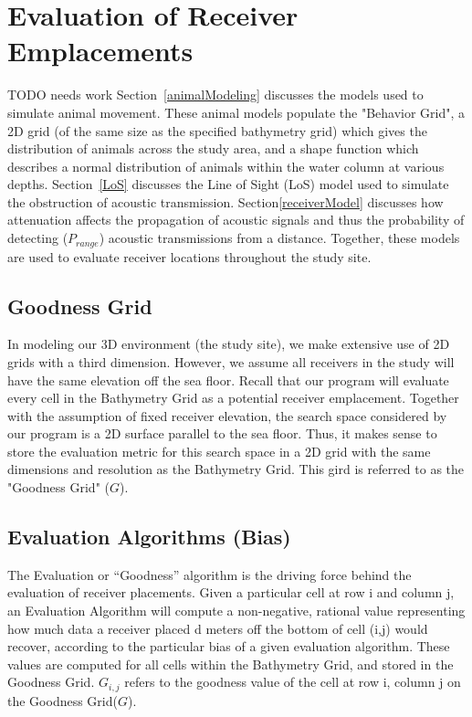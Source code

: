 \section{Evaluation of Receiver Emplacements} TODO needs work
\label{evaluationOfReceiver}
Section~\ref{animalModeling} discusses the models used to simulate animal movement.  These animal models populate the "Behavior Grid", a 2D grid (of the same size as the specified bathymetry grid) which gives the distribution of animals across the study area, and a shape function which describes a normal distribution of animals within the water column at various depths.  Section~\ref{LoS} discusses the Line of Sight (LoS) model used to simulate the obstruction of acoustic transmission.  Section\ref{receiverModel} discusses how attenuation affects the propagation of acoustic signals and thus the probability of detecting ($P_{range}$) acoustic transmissions from a distance.  Together, these models are used to evaluate receiver locations throughout the study site.  



\subsection{Goodness Grid}
\label{goodnessGrid}
In modeling our 3D environment (the study site), we make extensive use of 2D grids with a third dimension.  However, we assume all receivers in the study will have the same elevation off the sea floor.  Recall that our program will evaluate every cell in the Bathymetry Grid as a potential receiver emplacement.  Together with the assumption of fixed receiver elevation, the search space considered by our program is a 2D surface parallel to the sea floor.  Thus, it makes sense to store the evaluation metric for this search space in a 2D grid with the same dimensions and resolution as the Bathymetry Grid.  This gird is referred to as the "Goodness Grid" ($G$).  

\subsection{Evaluation Algorithms (Bias)}
The Evaluation or “Goodness” algorithm is the driving force behind the evaluation of receiver placements.  Given a particular cell at row i and column j, an Evaluation Algorithm will compute a non-negative, rational value representing how much data a receiver placed d meters off the bottom of cell (i,j) would recover, according to the particular bias of a given evaluation algorithm.  These values are computed for all cells within the Bathymetry Grid, and stored in the Goodness Grid.  $G_{i,j}$ refers to the goodness value of the cell at row i, column j on the Goodness Grid($G$).  

